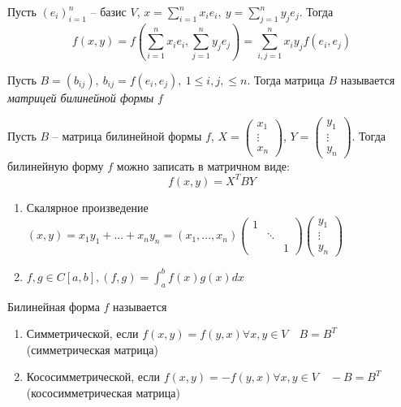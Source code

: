 \begin{Rem}
	Пусть 	$(e_i)_{i=1}^n$ -- базис $V$, $x = \sum_{i=1}^{n} x_ie_i, \ y = \sum_{j=1}^{n} y_je_j$. 
	Тогда 
	\[f(x, y) = f\left(\sum_{i = 1}^n x_ie_i, \sum_{j = 1}^n y_je_j\right) = \sum_{i, j = 1}^{n} x_i y_j f(e_i, e_j)\]
\end{Rem}

\begin{Def} 
	Пусть $B = (b_{ij}), \ b_{ij} = f(e_i, e_j), \ 1 \leqslant i, j, \leqslant n$.
	Тогда матрица $B$ называется \textit{матрицей билинейной формы}  $f$
\end{Def} 

\begin{Rem}
	Пусть $B$ -- матрица билинейной формы $f$, 
	$X = \left(
		\begin{array}{c}	
		x_1\\
		\vdots\\
		x_n
	\end{array}\right)$, $Y = \left(
	\begin{array}{ccc}	
		y_1\\
		\vdots\\
		y_n
	\end{array}\right)$. Тогда билинейную форму $f$ можно записать в матричном виде:
	\[f(x, y) = X^T B Y\]
\end{Rem}

\begin{Example}
	\begin{enumerate}
		\item Скалярное произведение $(x, y) = x_1y_1 + ... + x_ny_n = (x_1, ..., x_n) \left(
			\begin{array}{ccc}	
				1 & &\\
				& \ddots &\\
				& & 1
			\end{array}\right) \left(
				\begin{array}{ccc}	
					y_1\\
					\vdots\\
					y_n
				\end{array}\right)$
		\item $f, g \in C[a,b], (f, g) = \int_{a}^{b} f(x)g(x)dx$
	\end{enumerate}	
\end{Example}

\begin{Def} 
	Билинейная форма $f$ называется
	\begin{enumerate}
		\item Симметрической, если $f(x,y) = f(y,x) \forall x, y \in V \quad B = B^T$ (симметрическая матрица)
		\item Кососимметрической, если $f(x, y) = -f (y,x) \forall x, y \in V \quad -B = B^T$ (кососимметрическая матрица)
	\end{enumerate}
\end{Def} 

